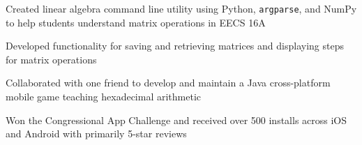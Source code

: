\documentclass[]{deedy-resume-openfont}
\begin{document}
\begin{minipage}[t]{0.66\textwidth}
\begin{tightemize}
\item Created linear algebra command line utility using Python, \texttt{argparse}, and NumPy to help students understand matrix operations in EECS 16A
\item Developed functionality for saving and retrieving matrices and displaying steps for matrix operations
\end{tightemize}
\sectionsep

\begin{tightemize}
\item Collaborated with one friend to develop and maintain a Java cross-platform mobile game teaching hexadecimal arithmetic
\item Won the Congressional App Challenge and received over 500 installs across iOS and Android with primarily 5-star reviews
\end{tightemize}
\sectionsep

\end{minipage} 
\end{document}
